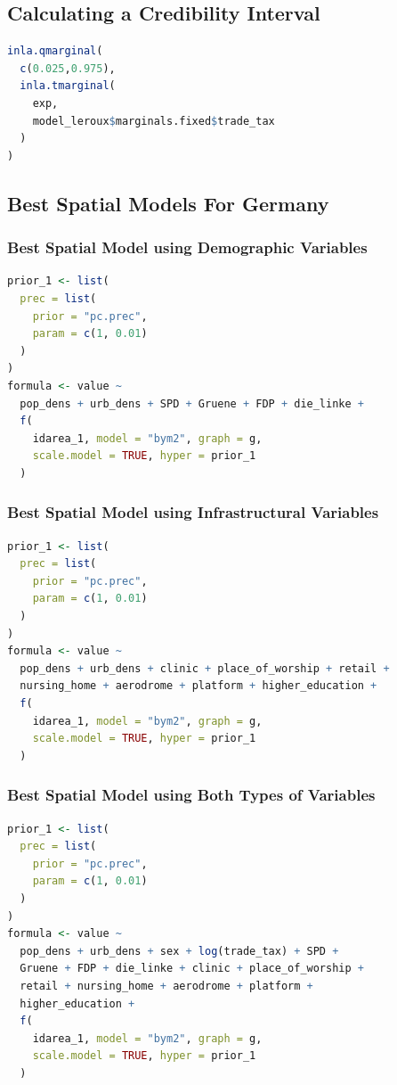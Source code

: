 \subsection{Calculating a Credibility Interval}
\begin{lstlisting}[caption={Extracting the credibility interval for a coefficient}, label={codeCredibility}, language=R]
inla.qmarginal(
  c(0.025,0.975),
  inla.tmarginal(
    exp,
    model_leroux$marginals.fixed$trade_tax
  )
)
\end{lstlisting}
\subsection{Best Spatial Models For Germany}
\subsubsection{Best Spatial Model using Demographic Variables}
\begin{lstlisting}[caption={The code for the demographic model.}, label={codeDemoGermany}, language=R]
prior_1 <- list(
  prec = list(
    prior = "pc.prec",
    param = c(1, 0.01)
  )
)
formula <- value ~
  pop_dens + urb_dens + SPD + Gruene + FDP + die_linke +
  f(
    idarea_1, model = "bym2", graph = g,
    scale.model = TRUE, hyper = prior_1
  )
\end{lstlisting}
\subsubsection{Best Spatial Model using Infrastructural Variables}
\begin{lstlisting}[caption={The code for the infrastructure model.}, label={codeInfraGermany}, language=R]
prior_1 <- list(
  prec = list(
    prior = "pc.prec",
    param = c(1, 0.01)
  )
)
formula <- value ~
  pop_dens + urb_dens + clinic + place_of_worship + retail +
  nursing_home + aerodrome + platform + higher_education +
  f(
    idarea_1, model = "bym2", graph = g,
    scale.model = TRUE, hyper = prior_1
  )
\end{lstlisting}
\subsubsection{Best Spatial Model using Both Types of Variables}
\begin{lstlisting}[caption={The code for the demographic + infrastructure model.}, label={codeBothGermany}, language=R]
prior_1 <- list(
  prec = list(
    prior = "pc.prec",
    param = c(1, 0.01)
  )
)
formula <- value ~
  pop_dens + urb_dens + sex + log(trade_tax) + SPD +
  Gruene + FDP + die_linke + clinic + place_of_worship +
  retail + nursing_home + aerodrome + platform +
  higher_education +
  f(
    idarea_1, model = "bym2", graph = g,
    scale.model = TRUE, hyper = prior_1
  )
\end{lstlisting}
